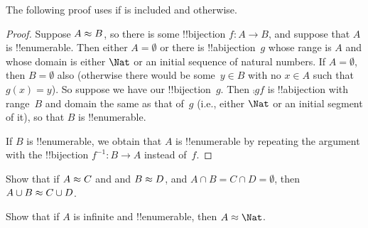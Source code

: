 \documentclass[../../../include/open-logic-section]{subfiles}
\begin{document}
\begin{editorial}
The following proof uses  if
 is included and 
otherwise.
\end{editorial}

\begin{proof}
Suppose $A \approx B$, so there is some !!{bijection} $f \colon A
\to B$, and suppose that $A$ is !!{enumerable}.
{
  Then either $A  = \emptyset$ or there is !!a{bijection}~$g$ whose
  range is $A$ and whose domain is either $\Nat$ or an initial
  sequence of natural numbers. If $A = \emptyset$, then $B =
  \emptyset$ also (otherwise there would be some~$y \in B$ with no $x
  \in A$ such that $g(x) = y$). So suppose we have our
  !!{bijection}~$g$. Then $\comp{g}{f}$ is !!a{bijection} with
  range~$B$ and domain the same as that of~$g$ (i.e., either $\Nat$ or
  an initial segment of it), so that $B$ is !!{enumerable}.}

If $B$ is !!{enumerable}, we obtain that $A$ is !!{enumerable} by
repeating the argument with the !!{bijection} $f^{-1}\colon B \to A$
instead of~$f$. 
\end{proof}

\begin{prob}
Show that if $A \approx C$ and and $B \approx D$, and $A \cap B =
C \cap D = \emptyset$, then $A \cup B \approx C \cup D$.
\end{prob}

\begin{prob}
Show that if $A$ is infinite and !!{enumerable}, then
$\cardeq{A}{\Nat}$.
\end{prob}
\end{document}
